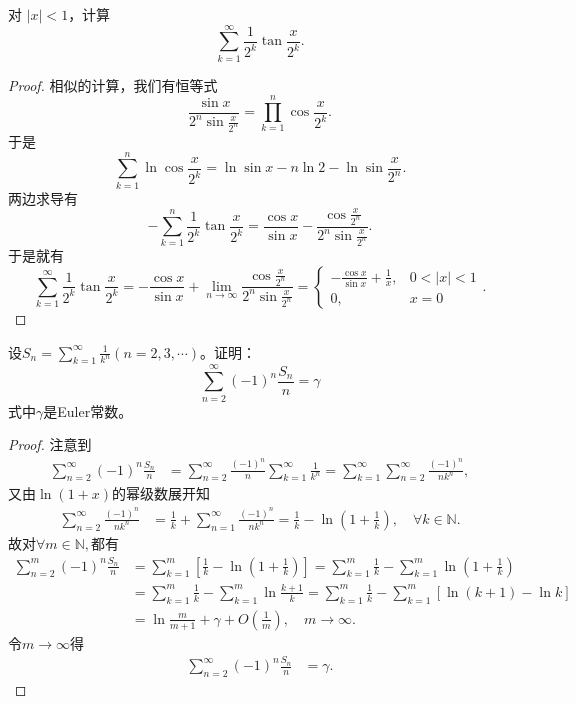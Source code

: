 \documentclass[../../main.tex]{subfiles}%
\begin{document}
\begin{example}
对 \(|x| < 1\)，计算
\[
\sum_{k=1}^{\infty} \frac{1}{2^k} \tan \frac{x}{2^k}.
\]
\end{example}
\begin{proof}
相似的计算，我们有恒等式
\[
\frac{\sin x}{2^n \sin \frac{x}{2^n}} = \prod_{k=1}^{n} \cos \frac{x}{2^k}.
\]
于是
\[
\sum_{k=1}^{n} \ln \cos \frac{x}{2^k}=\ln \sin x - n \ln 2 - \ln \sin \frac{x}{2^n}.
\]
两边求导有
\[
- \sum_{k=1}^{n} \frac{1}{2^k} \tan \frac{x}{2^k} = \frac{\cos x}{\sin x} - \frac{\cos \frac{x}{2^n}}{2^n \sin \frac{x}{2^n}}.
\]
于是就有
\[
\sum_{k=1}^{\infty} \frac{1}{2^k} \tan \frac{x}{2^k} = - \frac{\cos x}{\sin x} + \lim_{n \to \infty} \frac{\cos \frac{x}{2^n}}{2^n \sin \frac{x}{2^n}} = 
\begin{cases} 
- \frac{\cos x}{\sin x} + \frac{1}{x}, & 0 < |x| < 1 \\
0, & x = 0 
\end{cases}.
\]
\end{proof}

\begin{example}
设\(S_{n}=\sum_{k = 1}^{\infty}\frac{1}{k^{n}}(n = 2,3,\cdots)\)。证明：
\[
\sum_{n = 2}^{\infty}(-1)^{n}\frac{S_{n}}{n}=\gamma
\]
式中\(\gamma\)是Euler常数。
\end{example}
\begin{proof}
注意到
\begin{align*}
\sum_{n=2}^{\infty}{\left( -1 \right) ^n\frac{S_n}{n}}&=\sum_{n=2}^{\infty}{\frac{\left( -1 \right) ^n}{n}\sum_{k=1}^{\infty}{\frac{1}{k^n}}}=\sum_{k=1}^{\infty}{\sum_{n=2}^{\infty}{\frac{\left( -1 \right) ^n}{nk^n}}},
\end{align*}
又由$\ln \left( 1+x \right)$的幂级数展开知
\begin{align*}
\sum_{n=2}^{\infty}{\frac{\left( -1 \right) ^n}{nk^n}}&=\frac{1}{k}+\sum_{n=1}^{\infty}{\frac{\left( -1 \right) ^n}{nk^n}}=\frac{1}{k}-\ln \left( 1+\frac{1}{k} \right) ,\quad \forall k\in \mathbb{N} .
\end{align*}
故对$\forall m\in \mathbb{N} ,$都有
\begin{align*}
\sum_{n=2}^m{\left( -1 \right) ^n\frac{S_n}{n}}&=\sum_{k=1}^m{\left[ \frac{1}{k}-\ln \left( 1+\frac{1}{k} \right) \right]}=\sum_{k=1}^m{\frac{1}{k}}-\sum_{k=1}^m{\ln \left( 1+\frac{1}{k} \right)}\\
&=\sum_{k=1}^m{\frac{1}{k}}-\sum_{k=1}^m{\ln \frac{k+1}{k}}=\sum_{k=1}^m{\frac{1}{k}}-\sum_{k=1}^m{\left[ \ln \left( k+1 \right) -\ln k \right]}\\
&=\ln \frac{m}{m+1}+\gamma +O\left( \frac{1}{m} \right) ,\quad m\rightarrow \infty .
\end{align*}
令$m\rightarrow \infty$得
\begin{align*}
\sum_{n=2}^{\infty}{\left( -1 \right) ^n\frac{S_n}{n}}&=\gamma .
\end{align*}
\end{proof}
\end{document}
